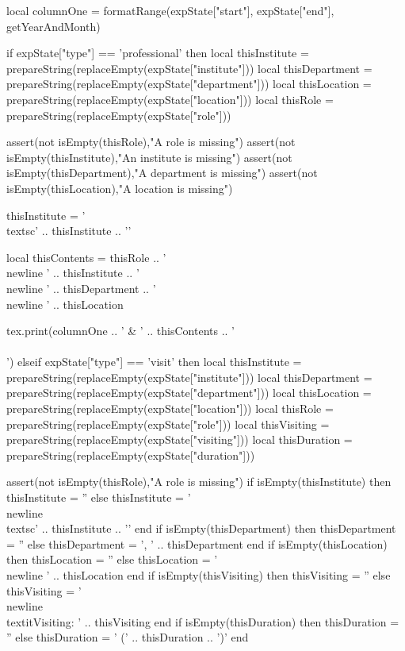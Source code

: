 \documentclass[letterpaper, 10pt]{article}
\begin{document}
\begin{luacode}
				local columnOne = formatRange(expState["start"], expState["end"], getYearAndMonth)

				if expState["type"] == 'professional' then
					local thisInstitute 	= prepareString(replaceEmpty(expState["institute"]))
					local thisDepartment    = prepareString(replaceEmpty(expState["department"]))
					local thisLocation      = prepareString(replaceEmpty(expState["location"]))
					local thisRole   		= prepareString(replaceEmpty(expState["role"]))

					assert(not isEmpty(thisRole),"A role is missing")
					assert(not isEmpty(thisInstitute),"An institute is missing")
					assert(not isEmpty(thisDepartment),"A department is missing")
					assert(not isEmpty(thisLocation),"A location is missing")

					thisInstitute = '\\textsc{' .. thisInstitute .. '}'

					local thisContents = thisRole ..
										'\\newline ' .. thisInstitute ..
										'\\newline ' .. thisDepartment ..
										'\\newline ' .. thisLocation

					tex.print(columnOne .. ' & ' .. thisContents .. ' \\\\')
				elseif expState["type"] == 'visit' then
					local thisInstitute 	= prepareString(replaceEmpty(expState["institute"]))
					local thisDepartment    = prepareString(replaceEmpty(expState["department"]))
					local thisLocation      = prepareString(replaceEmpty(expState["location"]))
					local thisRole   		= prepareString(replaceEmpty(expState["role"]))
					local thisVisiting    	= prepareString(replaceEmpty(expState["visiting"]))
					local thisDuration    	= prepareString(replaceEmpty(expState["duration"]))

					assert(not isEmpty(thisRole),"A role is missing")
					if isEmpty(thisInstitute) then
						thisInstitute = ''
					else
						thisInstitute = '\\newline \\textsc{' .. thisInstitute .. '}'
					end
					if isEmpty(thisDepartment) then
						thisDepartment = ''
					else
						thisDepartment = ', ' .. thisDepartment
					end
					if isEmpty(thisLocation) then
						thisLocation = ''
					else
						thisLocation = '\\newline ' .. thisLocation
					end
					if isEmpty(thisVisiting) then
						thisVisiting = ''
					else
						thisVisiting = '\\newline\\textit{Visiting}: ' .. thisVisiting
					end
					if isEmpty(thisDuration) then
						thisDuration = ''
					else
						thisDuration = ' (' .. thisDuration .. ')'
					end


\end{luacode}
\end{document}
